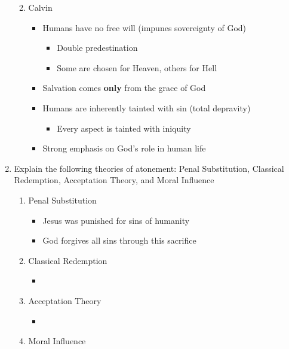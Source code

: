 \documentclass[8pt]{article}
\begin{document}
\begin{enumerate}
\begin{enumerate}
\begin{itemize}
        \end{itemize}
        \item Calvin
        \begin{itemize}
            \item Humans have no free will (impunes sovereignty of God)
            \begin{itemize}
                \item Double predestination
                \item Some are chosen for Heaven, others for Hell
            \end{itemize}
            \item Salvation comes \textbf{only} from the grace of God
            \item Humans are inherently tainted with sin (total depravity)
            \begin{itemize}
                \item Every aspect is tainted with iniquity
            \end{itemize}
            \item Strong emphasis on God's role in human life
        \end{itemize}
    \end{enumerate}

    \item Explain the following theories of atonement: Penal Substitution, Classical Redemption, Acceptation Theory, and Moral Influence
    \begin{enumerate}
        \item Penal Substitution
        \begin{itemize}
            \item Jesus was punished for sins of humanity
            \item God forgives all sins through this sacrifice
        \end{itemize}
        \item Classical Redemption
        \begin{itemize}
            \item
        \end{itemize}
        \item Acceptation Theory
        \begin{itemize}
            \item
        \end{itemize}
        \item Moral Influence
    \end{enumerate}


\end{enumerate}
\end{document}
